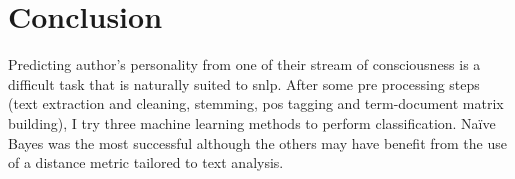 \section{Conclusion}
Predicting author's personality from one of their stream of consciousness is a difficult task that is naturally suited to \gls{snlp}. After some pre processing steps (text extraction and cleaning, stemming, \gls{pos} tagging and term-document matrix building), I try three machine learning methods to perform classification. Naïve Bayes was the most successful although the others may have benefit from the use of a distance metric tailored to text analysis.

